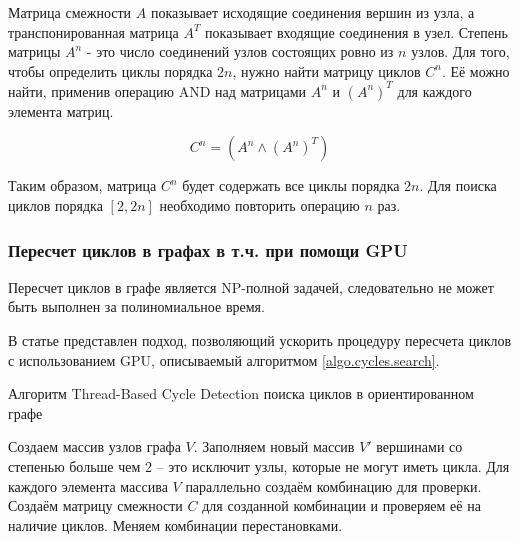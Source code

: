 Матрица смежности $A$ показывает исходящие соединения вершин из узла, а транспонированная матрица $A^T$ показывает входящие соединения в узел. Степень матрицы $A^n$ - это число соединений узлов состоящих ровно из $n$ узлов.
Для того, чтобы определить циклы порядка $2n$, нужно найти матрицу циклов $C^n$. Её можно найти, применив операцию \textsf{AND} над матрицами $A^n$ и $(A^n)^T$ для каждого элемента матриц.

\begin{equation}
    C^n = (A^n \wedge (A^n)^T)
\end{equation}

Таким образом, матрица $C^n$ будет содержать все циклы порядка $2n$. Для поиска циклов порядка $[2, 2n]$ необходимо повторить операцию $n$ раз.

\subsubsection{Пересчет циклов в графах в т.ч. при помощи GPU}

\begin{remark}
Пересчет циклов в графе является NP-полной задачей\cite{Mahdi2011}, следовательно не может быть выполнен за полиномиальное время.
\end{remark}

В статье \cite{Mahdi2011} представлен подход, позволяющий ускорить процедуру пересчета циклов с использованием \textsf{GPU}, описываемый алгоритмом \ref{algo.cycles.search}.

\begin{algorithm}[H]
\caption{Алгоритм Thread-Based Cycle Detection поиска циклов в ориентированном графе}\label{algo.cycles.search}
\begin{algorithmic}[1]
	\State Создаем массив узлов графа $V$.
	\State Заполняем новый массив $V'$ вершинами со степенью больше чем 2 -- это исключит узлы, которые не могут иметь цикла. 
	\State Для каждого элемента массива $V$ параллельно создаём комбинацию для проверки.
	\State Создаём матрицу смежности $C$ для созданной комбинации и проверяем её на наличие циклов.
	\State Меняем комбинации перестановками.
\end{algorithmic}
\end{algorithm}

\noteattributes{}
